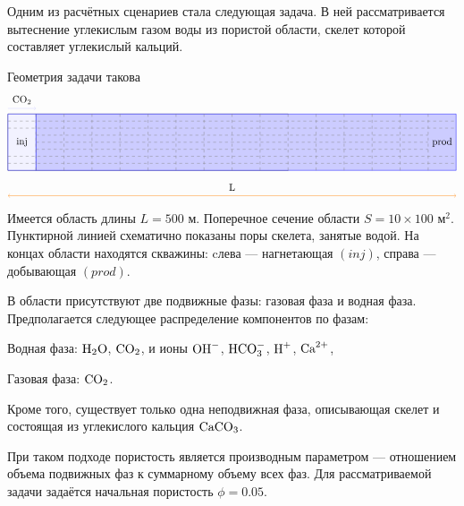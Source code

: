 \documentclass[14pt,a4paper]{extarticle}
\begin{document}
Одним из расчётных сценариев стала следующая задача. В ней рассматривается вытеснение углекислым газом воды из пористой области, скелет которой составляет углекислый кальций. 

Геометрия задачи такова
$$
\tikz {


\draw (0,0) --  +(10,0) -- +(10,2) -- +(0, 2) -- +(0,0);
\filldraw[fill=blue!20!white, draw=blue] (1,0) --  (16,0) -- (16,2) -- (1, 2) -- (1,0);
\filldraw[fill=blue!5!white, draw=blue] (0,0) --  (1,0) -- (1,2) -- (0, 2) -- (0,0);
\draw[dashed, gray] (0,0.25) -- (16,0.25); 
\draw[dashed, gray] (0,0.5) -- (16,0.5); 
\draw[dashed, gray] (1,0.75) -- (15,0.75); 
\draw[dashed, gray] (1, 1) -- (15, 1);
\draw[dashed, gray] (1,1.25) -- (15,1.25); 
\draw[dashed, gray] (0,1.5) -- (16,1.5); 
\draw[dashed, gray] (0,1.75) -- (16,1.75);

\draw[dashed, gray] (1,0) -- (1,2); 
\draw[dashed, gray] (2,0) -- (2,2); 
\draw[dashed, gray] (3,0) -- (3,2); 
\draw[dashed, gray] (4,0) -- (4,2); 
\draw[dashed, gray] (5,0) -- (5,2); 
\draw[dashed, gray] (6,0) -- (6,2); 
\draw[dashed, gray] (7,0) -- (7,2); 
\draw[dashed, gray] (8,0) -- (8,2);
\draw[dashed, gray] (9,0) -- (9,2);
\draw[dashed, gray] (10,0) -- (10,2); 
\draw[dashed, gray] (11,0) -- (11,2); 
\draw[dashed, gray] (12,0) -- (12,2); 
\draw[dashed, gray] (13,0) -- (13,2); 
\draw[dashed, gray] (14,0) -- (14,2); 
\draw[dashed, gray] (15,0) -- (15,2);

\draw [<->, orange] (0, -0.9) -- (16, -0.9); 
\draw [->, blue!20!white] (0, 2.2) -- (1, 2.2);
\fill
(0.5,1) node {inj}
(15.5,1) node {prod} 
(8,-0.6) node {L}
(0.5, 2.5) node {$\CARB$}
}
$$
Имеется область длины $L = 500 \text{ м}$. Поперечное сечение области $S = 10\times100 \text{ м}^2$. Пунктирной линией схематично показаны поры скелета, занятые водой. На концах области находятся скважины: cлева --- нагнетающая $(inj)$, справа --- добывающая $(prod)$. 

В области присутствуют две подвижные фазы: газовая фаза и водная фаза.
Предполагается следующее распределение компонентов по фазам:

Водная фаза: $ \text{H}_2\text{O}$, $ \text{CO}_2$, и ионы $ \text{OH}^-$, $ \text{HCO}_3^{-}$, $ \text{H}^+$, $ \text{Ca}^{2+}$,

Газовая фаза: $\text{CO}_2 $.

Кроме того, существует только одна неподвижная фаза, описывающая скелет и состоящая из углекислого кальция $\text{CaCO}_3$.

При таком подходе пористость является производным параметром — отношением объема подвижных фаз к суммарному объему всех фаз.
Для рассматриваемой задачи задаётся начальная пористость $\phi = 0.05$.
\end{document}
